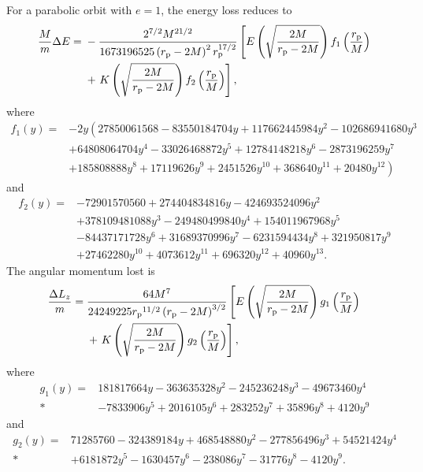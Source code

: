 For a parabolic orbit with $e = 1$, the energy loss reduces to
\begin{align}
\dfrac{M}{m} \Delta E = {} & -\dfrac{2^{7/2}M^{{21}/{2}}}{{1673196525 \left(r_\mathrm{p} - 2 M\right)^2 r_\mathrm{p}^{{17}/{2}}}} \left[E\left(\sqrt{\dfrac{2 M}{r_\mathrm{p} - 2 M}}\right) f_1\left(\dfrac{r_\mathrm{p}}{M}\right) \right. \nonumber \\*
 {} & + \left. K\left(\sqrt{\dfrac{2 M}{r_\mathrm{p} - 2 M}}\right) f_2\left(\dfrac{r_\mathrm{p}}{M}\right)\right],
\end{align}
where
\begin{align}
f_1(y) = {} & - 2 y \left(27850061568 - 83550184704 y + 117662445984 y^2 - 102686941680 y^3  \right. \nonumber \\ 
 {} & + \left. 64808064704 y^4 - 33026468872 y^5 + 12784148218 y^6 - 2873196259 y^7 \right. \nonumber \\ 
 {} & + \left. 185808888 y^8 + 17119626 y^9 + 2451526 y^{10} + 368640 y^{11} + 20480 y^{12} \right)
\end{align}
and
\begin{align}
f_2(y) = {} & -72901570560 + 274404834816 y - 424693524096 y^2 \nonumber \\ 
 {} & + \left. 378109481088 y^3 - 249480499840 y^4 + 154011967968 y^5 \right. \nonumber \\ 
 {} & - \left. 84437171728 y^6 + 31689370996 y^7 - 6231594434 y^8 + 321950817 y^9 \right. \nonumber \\ 
 {} & + \left. 27462280 y^{10} + 4073612 y^{11} + 696320 y^{12} + 40960 y^{13}. \right.
\end{align}
The angular momentum lost is
\begin{align}
\dfrac{\Delta L_{z}}{m} = {} & \dfrac{64 M^7}{24249225 {r_\mathrm{p}}^{{11}/{2}}\left(r_\mathrm{p} - 2 M \right)^{{3}/{2}}} \left[E\left(\sqrt{\dfrac{2 M}{r_\mathrm{p} - 2 M}}\right) g_1\left(\dfrac{r_\mathrm{p}}{M}\right) \right. \nonumber \\*
 {} & + \left.  K\left(\sqrt{\dfrac{2 M}{r_\mathrm{p} - 2 M}}\right) g_2\left(\dfrac{r_\mathrm{p}}{M}\right)\right],
\end{align}
where
\begin{align}
g_1(y) = {} & 181817664 y - 363635328 y^2 - 245236248 y^3 - 49673460 y^4  \nonumber \\*
 {} & - \left. 7833906 y^5 + 2016105 y^6 + 283252 y^7 + 35896 y^8 + 4120 y^9 \right.
\end{align}
and
\begin{align}
g_2(y) = {} & 71285760 - 324389184 y + 468548880 y^2 - 277856496 y^3 + 54521424 y^4 \nonumber \\*
 {} & + \left. 6181872 y^5 - 1630457 y^6 - 238086 y^7 - 31776 y^8 - 4120 y^9. \right.
\end{align}
